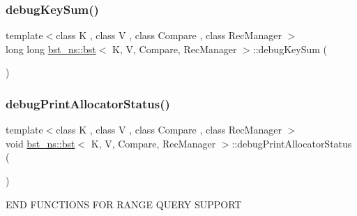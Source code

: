 \mbox{\label{classbst__ns_1_1bst_a1ef14de4c39bec643f720918c110f89a}} 
\subsubsection{\texorpdfstring{debug\+Key\+Sum()}{debugKeySum()}}
{\footnotesize\ttfamily template$<$class K , class V , class Compare , class Rec\+Manager $>$ \\
long long \hyperlink{classbst__ns_1_1bst}{bst\+\_\+ns\+::bst}$<$ K, V, Compare, Rec\+Manager $>$\+::debug\+Key\+Sum (\begin{DoxyParamCaption}{ }\end{DoxyParamCaption})\hspace{0.3cm}{\ttfamily [inline]}}

\mbox{\label{classbst__ns_1_1bst_a4b88ec8d5359baef55d780168792f988}} 
\subsubsection{\texorpdfstring{debug\+Print\+Allocator\+Status()}{debugPrintAllocatorStatus()}}
{\footnotesize\ttfamily template$<$class K , class V , class Compare , class Rec\+Manager $>$ \\
void \hyperlink{classbst__ns_1_1bst}{bst\+\_\+ns\+::bst}$<$ K, V, Compare, Rec\+Manager $>$\+::debug\+Print\+Allocator\+Status (\begin{DoxyParamCaption}{ }\end{DoxyParamCaption})\hspace{0.3cm}{\ttfamily [inline]}}

E\+ND F\+U\+N\+C\+T\+I\+O\+NS F\+OR R\+A\+N\+GE Q\+U\+E\+RY S\+U\+P\+P\+O\+RT \mbox{\label{classbst__ns_1_1bst_a86b206075f5fa4c2f272a6fb1b547421}} 
